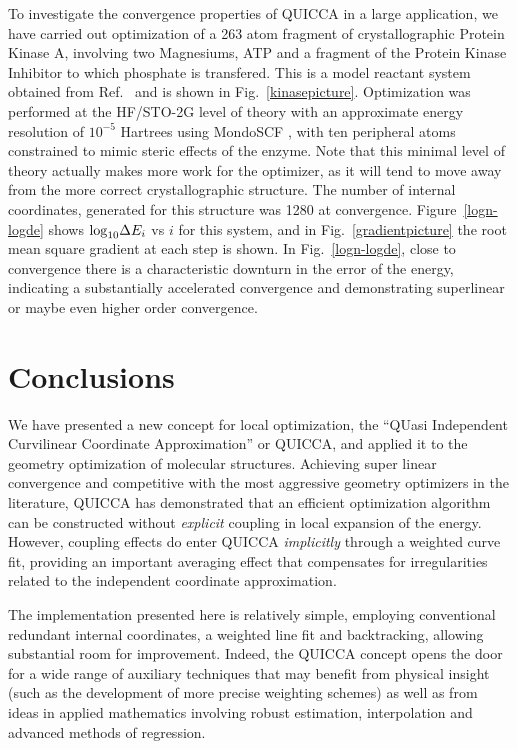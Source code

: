 \documentclass[prl,twocolumn,showpacs,twocolumngrid,superbib]{revtex4}
\begin{document}
To investigate the convergence properties of QUICCA in a large application, we have carried out
optimization of a 263 atom fragment of crystallographic Protein Kinase A, involving two Magnesiums, 
ATP and a fragment of the Protein Kinase Inhibitor to which phosphate is transfered. This is a
model reactant system obtained from Ref.~ and is shown in 
Fig.~\ref{kinasepicture}.   Optimization was performed at the HF/STO-2G level of theory with an 
approximate energy resolution of $10^{-5}$ Hartrees using MondoSCF \cite{MondoSCF}, with ten peripheral atoms 
constrained to mimic steric effects of the enzyme.  Note that this minimal level of theory actually 
makes more work for the optimizer, as it will tend to move away from the more correct crystallographic 
structure. The number of internal coordinates, generated for this structure
was 1280 at convergence.
Figure~\ref{logn-logde} shows ${\rm log}_{10} \Delta E_i$ vs $i$ for this system, and in 
Fig.~\ref{gradientpicture} the root mean square gradient at each step is shown.   
In Fig.~\ref{logn-logde}, close to convergence there is a 
characteristic downturn in the error of the energy, indicating
a substantially accelerated convergence and demonstrating superlinear
or maybe even higher order convergence.


\section{Conclusions}

We have presented a new concept for local optimization, the ``QUasi Independent Curvilinear 
Coordinate Approximation'' or  QUICCA, and applied it to the geometry optimization of molecular 
structures. Achieving super linear convergence and competitive with the most aggressive geometry 
optimizers in the literature, QUICCA has demonstrated that an efficient optimization algorithm 
can be constructed without {\em explicit} coupling in local expansion of the energy.  
However, coupling effects do enter QUICCA {\em implicitly} through a weighted curve fit, 
providing an important averaging effect that compensates for irregularities related
to the independent coordinate approximation.  

The implementation presented here is relatively simple, employing conventional redundant
internal coordinates, a weighted line fit and backtracking, allowing  substantial room for 
improvement.  Indeed, the QUICCA concept opens the door for a wide range of auxiliary techniques 
that may benefit from physical insight (such as the development of more precise weighting schemes) 
as well as from ideas in applied mathematics involving robust estimation, interpolation and 
advanced methods of regression.  
\end{document}
